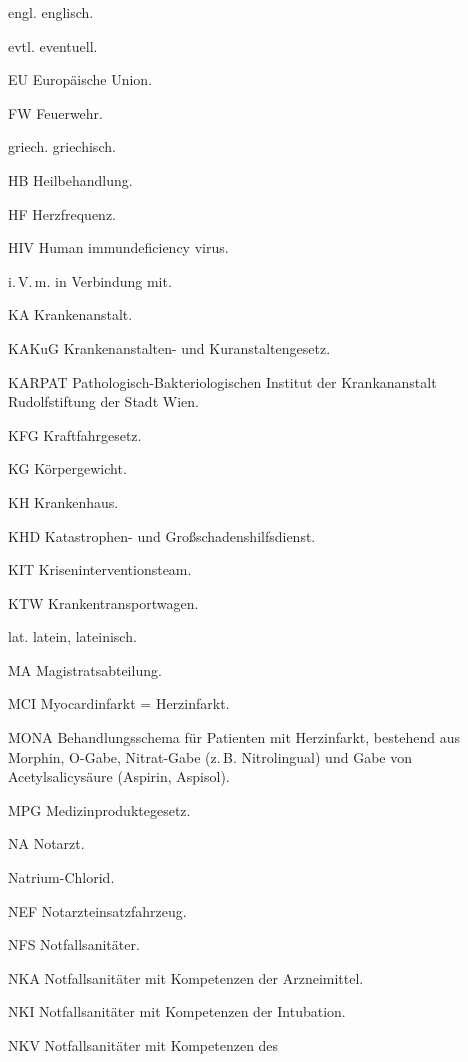 \documentclass[
ngerman,
paper=a4,
asymmetric,
fontsize=9pt,
headings=small,
draft=false,
parskip=false,
footnotes=multiple,
]{scrbook}
\begin{document}
\begin{gWideParEnv}
\begin{multicols}{3}
{\begin{compactdesc}
    \item[engl.] englisch. 
    \item[evtl.] eventuell. 
    \item[EU] Europäische Union. 
    \item[FW] Feuerwehr. 
    \item[griech.] griechisch. 
    \item[HB]   Heilbehandlung. 
    \item[HF] Herzfrequenz. 
    \item[HIV]  Human immundeficiency virus. 
    \item[i.\,V.\,m.] in Verbindung mit. 
    \item[KA]  Krankenanstalt. 
    \item[KAKuG]  Krankenanstalten- und Kuranstaltengesetz. 
    \item[KARPAT] Pathologisch-Bakteriologischen Institut der Krankananstalt
Rudolfstiftung der Stadt Wien. 
    \item[KFG]  Kraftfahrgesetz. 
    \item[KG] Körpergewicht. 
    \item[KH]  Krankenhaus. 
    \item[KHD] Katastrophen- und Großschadenshilfsdienst. 
    \item[KIT] Kriseninterventionsteam. 
    \item[KTW]  Krankentransportwagen. 
    \item[lat.] latein, lateinisch.
    \item[MA]  Magistratsabteilung. 
    \item[MCI]  Myocardinfarkt = Herzinfarkt. 
    \item[MONA]  Behandlungsschema für Patienten mit Herzinfarkt,
    bestehend aus Morphin, O-Gabe, Nitrat-Gabe (z.\,B. Nitrolingual) und
    Gabe von Acetylsalicysäure (Aspirin{\texttrademark},
    Aspisol{\texttrademark}).
    \item[MPG]  Medizinproduktegesetz. 
    \item[NA]  Notarzt. 
    \item[\ce{NaCl}]  Natrium-Chlorid. 
    \item[NEF]  Notarzteinsatzfahrzeug. 
    \item[NFS]  Notfallsanitäter. 
    \item[NKA]  Notfallsanitäter mit Kompetenzen der
    Arzneimittel. 
    \item[NKI]  Notfallsanitäter mit Kompetenzen der
    Intubation. 
    \item[NKV]  Notfallsanitäter mit Kompetenzen des

\end{compactdesc}}
\end{multicols}
\end{gWideParEnv}
\end{document}
